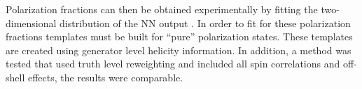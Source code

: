 Polarization fractions can then be obtained experimentally by fitting the two-dimensional distribution of the NN output \ctsNN.  
In order to fit for these polarization fractions templates must be built for ``pure'' polarization states. These
templates are created using generator level helicity information. In addition, a method was tested that used truth level reweighting and included all spin correlations and off-shell effects, the results were comparable.

